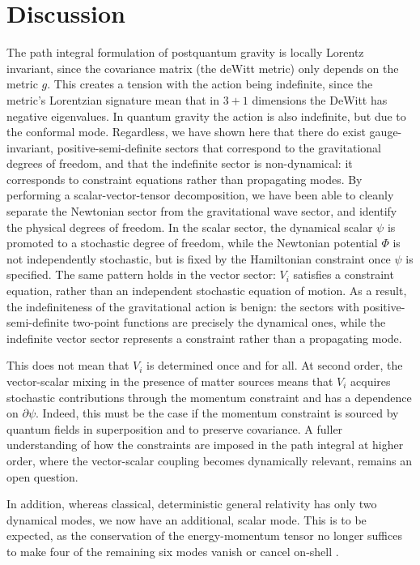 \documentclass[aps,preprintnumbers,superscriptaddress,longbibliography]{revtex4-1}
\newcommand{\MS}[1]{{\color{blue}#1}}
\newcommand{\JO}[1]{{\color{red}#1}}
\begin{document}
\section{Discussion}
\label{Discussion}
The path integral formulation of postquantum gravity is locally Lorentz invariant, since the covariance matrix (the deWitt metric) only depends on the metric $g$.  This creates a tension with the action being indefinite, since the metric's Lorentzian signature mean that in $3+1$ dimensions the DeWitt has negative eigenvalues.
In quantum gravity the action is also indefinite, but due to the conformal mode.  
Regardless, we have shown here that there do exist gauge-invariant, positive-semi-definite sectors that correspond to the gravitational degrees of freedom, and that the indefinite sector is non-dynamical: it corresponds to constraint equations rather than propagating modes.
 By performing a scalar-vector-tensor decomposition, we have been able to cleanly separate the Newtonian sector from the gravitational wave sector, and identify the physical degrees of freedom. In the scalar sector, the dynamical scalar $\psi$ is promoted to a stochastic degree of freedom, while the Newtonian potential $\Phi$ is not independently stochastic, but is fixed by the Hamiltonian constraint once $\psi$ is specified. The same pattern holds in the vector sector: $V_i$ satisfies a constraint equation, rather than an independent stochastic equation of motion. As a result, the indefiniteness of the gravitational action is benign: the sectors with positive-semi-definite two-point functions are precisely the dynamical ones, while the indefinite vector sector represents a constraint rather than a propagating mode.

This does not mean that $V_i$ is determined once and for all. At second order, the vector-scalar mixing in the presence of matter sources means that $V_i$ acquires stochastic contributions through the momentum constraint and has a dependence on $\partial\psi$. Indeed, this must be the case if the momentum constraint is sourced by quantum fields in superposition and to preserve covariance.
A fuller understanding of how the constraints are imposed in the path integral at higher order, where the vector-scalar coupling becomes dynamically relevant, remains an open question.

In addition, whereas classical, deterministic general relativity has only two dynamical modes, we now have an additional, scalar mode. This is to be expected, as the conservation of the energy-momentum tensor no longer suffices to make four of the remaining six modes vanish or cancel on-shell \cite{Spin2}. %
\end{document}
